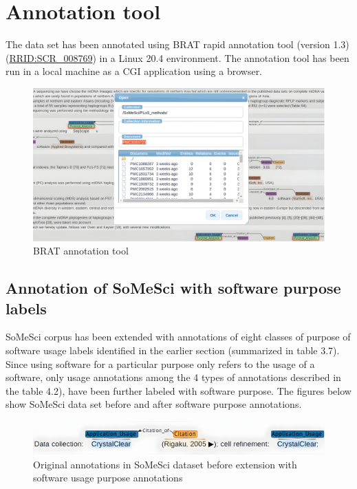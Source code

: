 \section{Annotation tool}
\label{sec:dataset:tool}
The data set has been annotated using BRAT rapid annotation tool (version 1.3) (\href{https://scicrunch.org/resolver/SCR_008769}{RRID:SCR\_008769})  in a Linux 20.4 environment. The annotation tool has been run in a local machine as a \ac{CGI} application using a browser. 

\begin{figure}[htbp]
	\centering
	\includegraphics[width=.66\textwidth]{4.graphics/figures/ch_4/BRAT_tool}
	\caption{BRAT annotation tool}
	\label{fig:chapter04:setup}
\end{figure}

\subsection{Annotation of SoMeSci with software purpose labels}
\label{subsec:dataset:tool:Annotationprocess}

\ac{SoMeSci} corpus has been extended with annotations of eight classes of purpose of software usage labels  identified in the earlier section (summarized in table 3.7). Since using software for a particular purpose only refers to the usage of a software, only usage annotations among the 4 types of annotations described in the table 4.2), have been further labeled with software purpose. The figures below show \ac{SoMeSci} data set before and after software purpose annotations. \\

\begin{figure}[htbp]
	\centering
	\includegraphics[width=.85\textwidth]{4.graphics/figures/ch_4/before_ann_hd_PMC3120364_FULLTEX_HD}
	\caption{Original annotations in \ac{SoMeSci} dataset before extension with software usage purpose annotations }
	\label{fig:chapter04:setup}
\end{figure}

